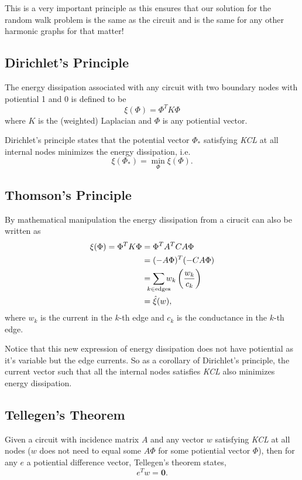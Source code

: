 \documentclass[]{article}
\begin{document}
This is a very important principle as this ensures that our solution for
the random walk problem is the same as the circuit and is the same for
any other harmonic graphs for that matter!

\subsection{Dirichlet's Principle}\label{dirichlets-principle}

The energy dissipation associated with any circuit with two boundary
nodes with potiential 1 and 0 is defined to be \[
\xi(\Phi) = \Phi^T K \Phi
\] where \(K\) is the (weighted) Laplacian and \(\Phi\) is any
potiential vector.

Dirichlet's principle states that the potential vector \(\Phi_*\)
satisfying \emph{KCL} at all internal nodes minimizes the energy
dissipation, i.e. \[\xi(\Phi_*) = \min_\Phi \xi(\Phi).\]

\subsection{Thomson's Principle}\label{thomsons-principle}

By mathematical manipulation the energy dissipation from a cirucit can
also be written as \[
\begin{split}
\xi(\Phi) = \Phi^T K \Phi & = \Phi^T A^T C A \Phi\\
& = (-A \Phi)^T (-CA \Phi)\\
& = \sum_{\mathclap{k \in \text{edges}}} w_k\left(\frac{w_k}{c_k}\right)\\
& = \hat{\xi}(w),
\end{split}
\] where \(w_k\) is the current in the \(k\)-th edge and \(c_k\) is the
conductance in the \(k\)-th edge.

Notice that this new expression of energy dissipation does not have
potiential as it's variable but the edge currents. So as a corollary of
Dirichlet's principle, the current vector such that all the internal
nodes satisfies \emph{KCL} also minimizes energy dissipation.

\subsection{Tellegen's Theorem}\label{tellegens-theorem}

Given a circuit with incidence matrix \(A\) and any vector \(w\)
satisfying \emph{KCL} at all nodes (\(w\) does not need to equal some
\(A\Phi\) for some potiential vector \(\Phi\)), then for any \(e\) a
potiential difference vector, Tellegen's theorem states,
\[ e^T w = \mathbf{0}. \]
\end{document}
